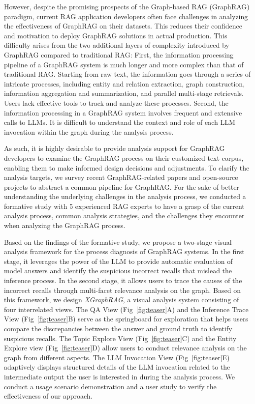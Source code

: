 However, despite the promising prospects of the Graph-based RAG (GraphRAG) paradigm, current RAG application developers often face challenges in analyzing the effectiveness of GraphRAG on their datasets. This reduces their confidence and motivation to deploy GraphRAG solutions in actual production. This difficulty arises from the two additional layers of complexity introduced by GraphRAG compared to traditional RAG: First, the information processing pipeline of a GraphRAG system is much longer and more complex than that of traditional RAG. Starting from raw text, the information goes through a series of intricate processes, including entity and relation extraction, graph construction, information aggregation and summarization, and parallel multi-stage retrievals. Users lack effective tools to track and analyze these processes. Second, the information processing in a GraphRAG system involves frequent and extensive calls to LLMs. It is difficult to understand the context and role of each LLM invocation within the graph during the analysis process.


As such, it is highly desirable to provide analysis support for GraphRAG developers to examine the GraphRAG process on their customized text corpus, enabling them to make informed design decisions and adjustments. To clarify the analysis targets, we survey recent GraphRAG-related papers and open-source projects to abstract a common pipeline for GraphRAG. For the sake of better understanding the underlying challenges in the analysis process, we conducted a formative study with 5 experienced RAG experts to have a grasp of the current analysis process, common analysis strategies, and the challenges they encounter when analyzing the GraphRAG process.

Based on the findings of the formative study, we propose a two-stage visual analysis framework for the process diagnosis of GraphRAG systems. In the first stage, it leverages the power of the LLM to provide automatic evaluation of model answers and identify the suspicious incorrect recalls that mislead the inference process. In the second stage, it allows users to trace the causes of the incorrect recalls through multi-facet relevance analysis on the graph. Based on this framework, we design \textit{XGraphRAG}, a visual analysis system consisting of four interrelated views. The QA View (Fig~\ref{fig:teaser}A) and the Inference Trace View (Fig~\ref{fig:teaser}B) serve as the springboard for exploration that helps users compare the discrepancies between the answer and ground truth to identify suspicious recalls. The Topic Explore View (Fig~\ref{fig:teaser}C) and the Entity Explore view (Fig~\ref{fig:teaser}D) allow users to conduct relevance analysis on the graph from different aspects. The LLM Invocation View (Fig~\ref{fig:teaser}E) adaptively displays structured details of the LLM invocation related to the intermediate output the user is interested in during the analysis process. We conduct a usage scenario demonstration and a user study to verify the effectiveness of our approach.


